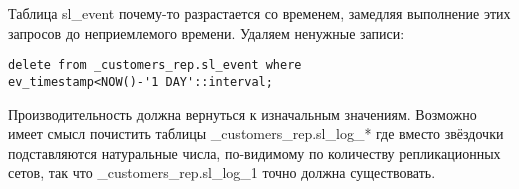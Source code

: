 Таблица sl\_event почему-то разрастается со временем, замедляя выполнение этих 
запросов до неприемлемого времени. Удаляем ненужные записи:
\begin{lstlisting}[label=lst:slony20,caption=Устранение неисправностей]
delete from _customers_rep.sl_event where 
ev_timestamp<NOW()-'1 DAY'::interval;
\end{lstlisting}

Производительность должна вернуться к изначальным значениям. 
Возможно имеет смысл почистить таблицы \_customers\_rep.sl\_log\_* где 
вместо звёздочки подставляются натуральные числа, по-видимому по 
количеству репликационных сетов, так что \_customers\_rep.sl\_log\_1 
точно должна существовать. 